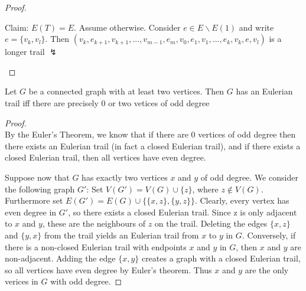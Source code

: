 \begin{proof}
\begin{enumerate}
\begin{center}
\end{center}
\par
        Claim: $E(T)=E$. Assume otherwise. Consider $e\in E\backslash E(1)$ and write $e=\{v_k,v_l\}$. Then $(v_k,e_{k+1},v_{k+1},...,v_{m-1},e_m,v_0,e_1,v_1,...,e_k,v_k,e,v_l)$ is a longer trail $\lightning$ 
    \end{enumerate}
\end{proof}
\vspace{0.5cm}

\begin{theorem}
    Let $G$ be a connected graph with at least two vertices. Then $G$ has an Eulerian trail iff there are precisely $0$ or two vetices of odd degree
\end{theorem}
\begin{proof}
    \hfill\\
    By the Euler's Theorem, we know that if there are $0$ vertices of odd degree then there exists an Eulerian trail (in fact a closed Eulerian trail), and if there exists a closed Eulerian trail, then all vertices have even degree.\par
    Suppose now that $G$ has exactly two vertices $x$ and $y$ of odd degree. We consider the following graph $G'$: Set $V(G')=V(G)\cup \{z\}$, where $z\notin V(G)$. Furthermore set $E(G')=E(G)\cup\{\{x,z\},\{y,z\}\}$. Clearly, every vertex has even degree in $G'$, so there exists a closed Eulerian trail. Since z is only adjacent to $x$ and $y$, these are the neighbours of $z$ on the trail. Deleting the edges $\{x,z\}$ and $\{y,x\}$ from the trail yields an Eulerian trail from $x$ to $y$ in $G$. Conversely, if there is a non-closed Eulerian trail with endpoints $x$ and $y$ in $G$, then $x$ and $y$ are non-adjacent. Adding the edge $\{x,y\}$ creates a graph with a closed Eulerian trail, so all vertices have even degree by Euler's theorem. Thus $x$ and $y$ are the only verices in $G$ with odd degree.
\end{proof}